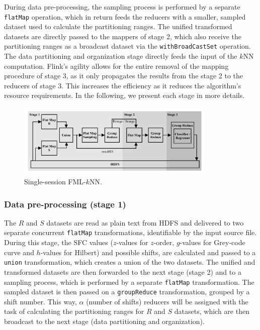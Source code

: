 During data pre-processing, the sampling process is performed by a separate \texttt{flatMap} operation, which in return feeds the reducers with a smaller, sampled dataset used to calculate the partitioning ranges. The unified transformed datasets are directly passed to the mappers of stage 2, which also receive the partitioning ranges as a broadcast dataset via the \texttt{withBroadCastSet} operation. The data partitioning and organization stage directly feeds the input of the $k$NN computation. Flink's agility allows for the entire removal of the mapping procedure of stage 3, as it only propagates the results from the stage 2 to the reducers of stage 3. This increases the efficiency as it reduces the algorithm's resource requirements. In the following, we present each stage in more details.

\begin{figure}[!tb]
	\centering
	\includegraphics[width=0.85\textwidth]{figures/figure4.png}
	\caption{Single-session FML-$k$NN.}
	\label{figure4}
\end{figure}

\subsubsection{Data pre-processing (stage 1)}
\label{par:algorithmic1}
The $R$ and $S$ datasets are read as plain text from HDFS and delivered to two separate concurrent \texttt{flatMap} transformations, identifiable by the input source file. During this stage, the SFC values ($z$-values for $z$-order, $g$-values for Grey-code curve and $h$-values for Hilbert) and possible shifts, are calculated and passed to a \texttt{union} transformation, which creates a union of the two datasets. The unified and transformed datasets are then forwarded to the next stage (stage 2) and to a sampling process, which is performed by a separate \texttt{flatMap} transformation. The sampled dataset is then passed on a \texttt{groupReduce} transformation, grouped by a shift number. This way, $\alpha$ (number of shifts) reducers will be assigned with the task of calculating the partitioning ranges for $R$ and $S$ datasets, which are then broadcast to the next stage (data partitioning and organization). 

